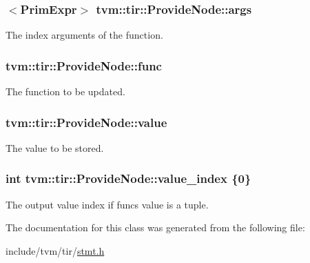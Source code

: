 \subsubsection[{\texorpdfstring{args}{args}}]{$<${\bf Prim\+Expr}$>$ tvm\+::tir\+::\+Provide\+Node\+::args}\hypertarget{classtvm_1_1tir_1_1ProvideNode_a595dcef23f7615e871bd8f5052db6626}{}\label{classtvm_1_1tir_1_1ProvideNode_a595dcef23f7615e871bd8f5052db6626}


The index arguments of the function. 

\subsubsection[{\texorpdfstring{func}{func}}]{ tvm\+::tir\+::\+Provide\+Node\+::func}\hypertarget{classtvm_1_1tir_1_1ProvideNode_ae733ea7142d3c2823a60bdb3bd9b8f3c}{}\label{classtvm_1_1tir_1_1ProvideNode_ae733ea7142d3c2823a60bdb3bd9b8f3c}


The function to be updated. 

\subsubsection[{\texorpdfstring{value}{value}}]{ tvm\+::tir\+::\+Provide\+Node\+::value}\hypertarget{classtvm_1_1tir_1_1ProvideNode_a8ea72dcf6b347c0f19ba53fb6f7aa934}{}\label{classtvm_1_1tir_1_1ProvideNode_a8ea72dcf6b347c0f19ba53fb6f7aa934}


The value to be stored. 

\subsubsection[{\texorpdfstring{value\+\_\+index}{value_index}}]{\setlength{\rightskip}{0pt plus 5cm}int tvm\+::tir\+::\+Provide\+Node\+::value\+\_\+index \{0\}}\hypertarget{classtvm_1_1tir_1_1ProvideNode_a043817fe37e1d7b5937b549621cb101d}{}\label{classtvm_1_1tir_1_1ProvideNode_a043817fe37e1d7b5937b549621cb101d}


The output value index if func\textquotesingle{}s value is a tuple. 



The documentation for this class was generated from the following file\+:\begin{DoxyCompactItemize}
\item 
include/tvm/tir/\hyperlink{stmt_8h}{stmt.\+h}\end{DoxyCompactItemize}
